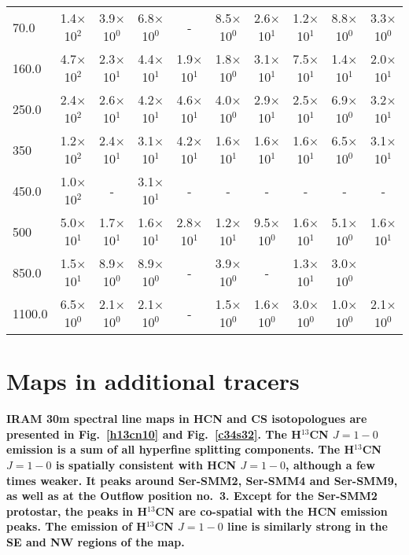 \documentclass{aa}
\begin{document}
\begin{appendix}
\begin{table*}
\begin{tabular}{l c c c c c c c c c}
70.0 & 1.4$\times$10$^{2}$ & 3.9$\times$10$^{0}$ & 6.8$\times$10$^{0}$ & - & 8.5$\times$10$^{0}$ & 2.6$\times$10$^{1}$ & 1.2$\times$10$^{1}$ & 8.8$\times$10$^{0}$ & 3.3$\times$10$^{0}$\\
160.0 & 4.7$\times$10$^{2}$ & 2.3$\times$10$^{1}$ & 4.4$\times$10$^{1}$ & 1.9$\times$10$^{1}$ & 1.8$\times$10$^{0}$ & 3.1$\times$10$^{1}$ & 7.5$\times$10$^{1}$ & 1.4$\times$10$^{1}$ & 2.0$\times$10$^{1}$\\
250.0 &  2.4$\times$10$^{2}$ & 2.6$\times$10$^{1}$ & 4.2$\times$10$^{1}$ & 4.6$\times$10$^{1}$ & 4.0$\times$10$^{0}$ & 2.9$\times$10$^{1}$ & 2.5$\times$10$^{1}$ & 6.9$\times$10$^{0}$ & 3.2$\times$10$^{1}$\\
350 & 1.2$\times$10$^{2}$ & 2.4$\times$10$^{1}$ & 3.1$\times$10$^{1}$ & 4.2$\times$10$^{1}$ & 1.6$\times$10$^{1}$ & 1.6$\times$10$^{1}$ & 1.6$\times$10$^{1}$ & 6.5$\times$10$^{0}$ & 3.1$\times$10$^{1}$\\
450.0 & 1.0$\times$10$^{2}$ &-  & 3.1$\times$10$^{1}$ &- &- &- &- &- &-\\
500 & 5.0$\times$10$^{1}$ & 1.7$\times$10$^{1}$ & 1.6$\times$10$^{1}$ & 2.8$\times$10$^{1}$ & 1.2$\times$10$^{1}$ & 9.5$\times$10$^{0}$ & 1.6$\times$10$^{1}$ & 5.1$\times$10$^{0}$ & 1.6$\times$10$^{1}$\\
850.0 & 1.5$\times$10$^{1}$ & 8.9$\times$10$^{0}$ & 8.9$\times$10$^{0}$ & - & 3.9$\times$10$^{0}$ & - & 1.3$\times$10$^{1}$ & 3.0$\times$10$^{0}$ &\\
1100.0 & 6.5$\times$10$^{0}$ & 2.1$\times$10$^{0}$ & 2.1$\times$10$^{0}$ & - & 1.5$\times$10$^{0}$ & 1.6$\times$10$^{0}$ & 3.0$\times$10$^{0}$ & 1.0$\times$10$^{0}$ & 2.1$\times$10$^{0}$\\
\hline \end{tabular} 
\end{table*}

\section{Maps in additional tracers}

\textbf{IRAM 30m spectral line maps in HCN and CS isotopologues are presented in Fig.~\ref{h13cn10} and Fig.~\ref{c34s32}. The H$^{13}$CN $J=1-0$ emission is a sum of all hyperfine splitting components. The H$^{13}$CN $J=1-0$ is spatially consistent with HCN $J=1-0$, although a few times weaker. It peaks around Ser-SMM2, Ser-SMM4 and Ser-SMM9, as well as at the Outflow position no.~3. Except for the Ser-SMM2 protostar, the peaks in H$^{13}$CN are co-spatial with the HCN emission peaks. The emission of H$^{13}$CN $J=1-0$ line is similarly strong in the SE and NW regions of the map.}


\end{appendix}
\end{document}

